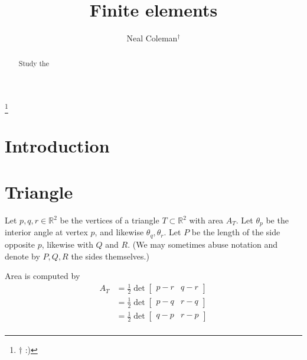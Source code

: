 \documentclass[12pt]{amsart}
\begin{document}
\author[Neal Coleman]{Neal Coleman$^\dagger$}
\thanks{$\dagger$ :)}

\title[Piecewise linear finite elements]{Finite elements}

\address{Chicagoland} %

\begin{abstract}
Study the
\end{abstract}
\maketitle


\thispagestyle{empty} %

\section*{Introduction}



\section*{Triangle}

Let $p, q, r\in\mathbb{R}^2$ be the vertices of a triangle $T\subset\mathbb{R}^2$ with area $A_T$. Let $\theta_p$ be the interior angle at vertex $p$, and likewise $\theta_q, \theta_r$. Let $P$ be the length of the side opposite $p$, likewise with $Q$ and $R$. (We may sometimes abuse notation and denote by $P,Q,R$ the sides themselves.)

Area is computed by
\begin{align*}
A_T &= \frac{1}{2}\det\left[\begin{array}{c|c} p - r & q - r \end{array}\right] \\
	&= \frac{1}{2}\det\left[\begin{array}{c|c} p - q & r - q \end{array}\right] \\
	&= \frac{1}{2}\det\left[\begin{array}{c|c} q - p & r - p \end{array}\right] \\
\end{align*}
\end{document}
